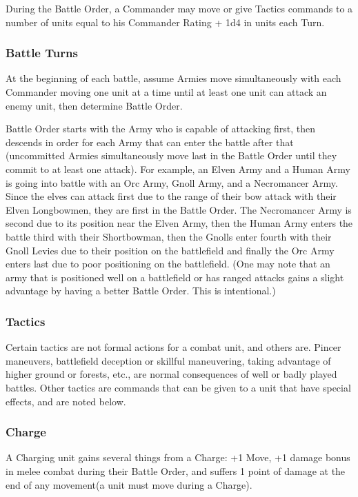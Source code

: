 During the Battle Order, a Commander may move or give Tactics commands to a number of units equal to his Commander Rating + 1d4 in units each Turn.

\subsubsection{Battle Turns} At the beginning of each battle, assume Armies move simultaneously with each Commander moving one unit at a time until at least one unit can attack an enemy unit, then determine Battle Order.

Battle Order starts with the Army who is capable of attacking first, then descends in order for each Army that can enter the battle after that (uncommitted Armies simultaneously move last in the Battle Order until they commit to at least one attack). For example, an Elven Army and a Human Army is going into battle with an Orc Army, Gnoll Army, and a Necromancer Army. Since the elves can attack first due to the range of their bow attack with their Elven Longbowmen, they are first in the Battle Order. The Necromancer Army is second due to its position near the Elven Army, then the Human Army enters the battle third with their Shortbowman, then the Gnolls enter fourth with their Gnoll Levies due to their position on the battlefield and finally the Orc Army enters last due to poor positioning on the battlefield. (One may note that an army that is positioned well on a battlefield or has ranged attacks gains a slight advantage by having a better Battle Order. This is intentional.)

\subsubsection{Tactics} Certain tactics are not formal actions for a combat unit, and others are. Pincer maneuvers, battlefield deception or skillful maneuvering, taking advantage of higher ground or forests, etc., are normal consequences of well or badly played battles. Other tactics are commands that can be given to a unit that have special effects, and are noted below.

\subsubsection{Charge} A Charging unit gains several things from a Charge: +1 Move, +1 damage bonus in melee combat during their Battle Order, and suffers 1 point of damage at the end of any movement(a unit must move during a Charge).

